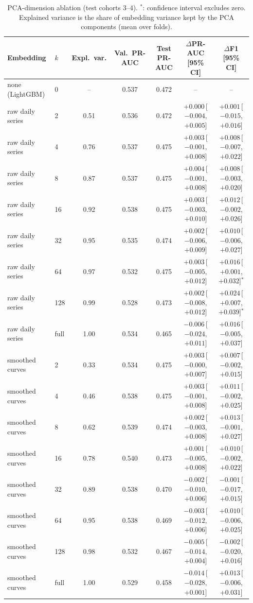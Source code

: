 \begin{table}[H]\centering\small\setlength{\tabcolsep}{4pt}
\begin{tabular}{llccccc}\toprule
Embedding & $k$ & Expl.\ var. & Val.\ PR-AUC & Test PR-AUC & $\Delta$PR-AUC [95\% CI] & $\Delta$F1 [95\% CI]\\\midrule
none (LightGBM) & 0 & -- & 0.537 & 0.472 & -- & --\\\midrule
raw daily series & 2 & 0.51 & 0.536 & 0.472 & $+0.000$\,[$-0.004$, $+0.005$] & $+0.001$\,[$-0.015$, $+0.016$]\\
raw daily series & 4 & 0.76 & 0.537 & 0.475 & $+0.003$\,[$-0.001$, $+0.008$] & $+0.008$\,[$-0.007$, $+0.022$]\\
raw daily series & 8 & 0.87 & 0.537 & 0.475 & $+0.004$\,[$-0.001$, $+0.008$] & $+0.008$\,[$-0.003$, $+0.020$]\\
raw daily series & 16 & 0.92 & 0.538 & 0.475 & $+0.003$\,[$-0.003$, $+0.010$] & $+0.012$\,[$-0.002$, $+0.026$]\\
raw daily series & 32 & 0.95 & 0.535 & 0.474 & $+0.002$\,[$-0.006$, $+0.009$] & $+0.010$\,[$-0.006$, $+0.027$]\\
raw daily series & 64 & 0.97 & 0.532 & 0.475 & $+0.003$\,[$-0.005$, $+0.012$] & $+0.016$\,[$+0.001$, $+0.032$]$^{*}$\\
raw daily series & 128 & 0.99 & 0.528 & 0.473 & $+0.002$\,[$-0.008$, $+0.012$] & $+0.024$\,[$+0.007$, $+0.039$]$^{*}$\\
raw daily series & full & 1.00 & 0.534 & 0.465 & $-0.006$\,[$-0.024$, $+0.011$] & $+0.016$\,[$-0.005$, $+0.037$]\\
\midrule
smoothed curves & 2 & 0.33 & 0.534 & 0.475 & $+0.003$\,[$-0.000$, $+0.007$] & $+0.007$\,[$-0.002$, $+0.015$]\\
smoothed curves & 4 & 0.46 & 0.538 & 0.475 & $+0.003$\,[$-0.001$, $+0.008$] & $+0.011$\,[$-0.002$, $+0.025$]\\
smoothed curves & 8 & 0.62 & 0.539 & 0.474 & $+0.002$\,[$-0.003$, $+0.008$] & $+0.013$\,[$-0.001$, $+0.027$]\\
smoothed curves & 16 & 0.78 & 0.540 & 0.473 & $+0.001$\,[$-0.005$, $+0.008$] & $+0.010$\,[$-0.002$, $+0.022$]\\
smoothed curves & 32 & 0.89 & 0.538 & 0.470 & $-0.002$\,[$-0.010$, $+0.006$] & $-0.001$\,[$-0.017$, $+0.015$]\\
smoothed curves & 64 & 0.95 & 0.538 & 0.469 & $-0.003$\,[$-0.012$, $+0.006$] & $+0.010$\,[$-0.006$, $+0.025$]\\
smoothed curves & 128 & 0.98 & 0.532 & 0.467 & $-0.005$\,[$-0.014$, $+0.004$] & $-0.002$\,[$-0.020$, $+0.016$]\\
smoothed curves & full & 1.00 & 0.529 & 0.458 & $-0.014$\,[$-0.028$, $+0.001$] & $+0.013$\,[$-0.006$, $+0.031$]\\
\bottomrule
\end{tabular}
\caption{PCA-dimension ablation (test cohorts 3--4). $^{*}$: confidence interval excludes zero.
Explained variance is the share of embedding variance kept by the PCA components (mean over folds).}
\label{tab:pca}\end{table}
